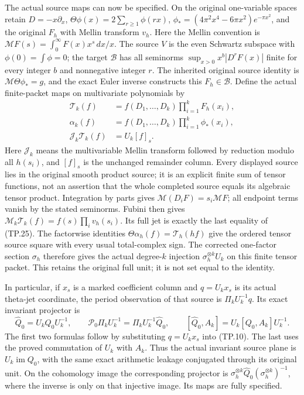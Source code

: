 The actual source maps can now be specified. On the
original one-variable spaces retain
\(D=-x\partial_x\),
\(\Theta\phi(x)=2\sum_{r\geq1}\phi(rx)\),
\(\phi_*=(4\pi^2x^4-6\pi x^2)e^{-\pi x^2}\), and
the original \(F_h\) with Mellin transform \(v_h\).
Here the Mellin convention is
\(\mathcal MF(s)=\int_0^\infty F(x)x^s\,dx/x\).
The source \(V\) is the even Schwartz subspace with
\(\phi(0)=\int\phi=0\); the target \(\mathscr B\)
has all seminorms \(\sup_{x>0}x^b|D^rF(x)|\) finite
for every integer \(b\) and nonnegative integer \(r\).
The inherited original source identity is
\(\mathcal M\Theta\phi_*=g\), and the exact Euler inverse
constructs this \(F_h\in\mathscr B\).
Define the actual finite-packet maps on multivariate
polynomials by
\[
 \begin{split}
 \mathcal T_k(f)&=f(D_1,\ldots,D_k)
                       \prod_{i=1}^k F_h(x_i),\\
 \alpha_k(f)&=f(D_1,\ldots,D_k)
                       \prod_{i=1}^k\phi_*(x_i),\\
 \mathcal J_k\mathcal T_k(f)&=U_k[f]_s.
 \end{split}
 \tag{TP.25}\label{CFStage:eq:tp-source}
\]
Here \(\mathcal J_k\) means the multivariable Mellin
transform followed by reduction modulo all \(h(s_i)\),
and \([f]_s\) is the unchanged remainder column.
Every displayed source lies in the original smooth
product source; it is an explicit finite sum of tensor
functions, not an assertion that the whole completed
source equals its algebraic tensor product.
Integration by parts gives
\(\mathcal M(D_iF)=s_i\mathcal MF\); all endpoint
terms vanish by the stated seminorms. Fubini then gives
\(\mathcal M_k\mathcal T_k(f)=f(s)\prod_i v_h(s_i)\).
Its full jet is exactly the last equality of (TP.25).
The factorwise identities
\(\Theta\alpha_h(f)=\mathcal T_h(hf)\)
give the ordered tensor source square with every usual
total-complex sign. The corrected one-factor section
\(\sigma_h\) therefore gives the actual degree-\(k\)
injection \(\sigma_h^{\otimes k}U_k\) on this finite
tensor packet. This retains the original full unit;
it is not set equal to the identity.

In particular, if \(x_s\) is a marked coefficient column
and \(q=U_kx_s\) is its actual theta-jet coordinate,
the period observation of that source is
\(\Pi_kU_k^{-1}q\). Its exact invariant projector is
\[
 \widehat Q_0=U_kQ_0U_k^{-1},\qquad
 \mathcal P_0\Pi_kU_k^{-1}
      =\Pi_kU_k^{-1}\widehat Q_0,\qquad
 [\widehat Q_0,A_k]=U_k[Q_0,A_k]U_k^{-1}.
 \tag{TP.26}\label{CFStage:eq:tp-sourceprojector}
\]
The first two formulas follow by substituting
\(q=U_kx_s\) into (TP.10). The last uses the proved
commutation of \(U_k\) with \(A_k\).
Thus the actual invariant source plane is
\(U_k\operatorname{im}Q_0\), with the same exact
arithmetic leakage conjugated through its original unit.
On the cohomology image the corresponding projector is
\(\sigma_h^{\otimes k}\widehat Q_0
(\sigma_h^{\otimes k})^{-1}\), where the inverse is
only on that injective image. Its maps are fully specified.

